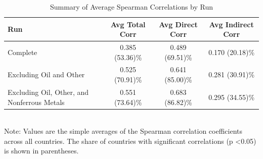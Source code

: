 \begin{table}[h]
\centering
\caption{Summary of Average Spearman Correlations by Run}
\begin{tabular}{lccc}
\toprule
\textbf{Run} & \textbf{Avg Total Corr} & \textbf{Avg Direct Corr} & \textbf{Avg Indirect Corr} \\
\midrule
Complete & 0.385 (53.36)\% & 0.489 (69.51)\% & 0.170 (20.18)\% \\
Excluding Oil and Other & 0.525 (70.91)\% & 0.641 (85.00)\% & 0.281 (30.91)\% \\
Excluding Oil, Other, and Nonferrous Metals & 0.551 (73.64)\% & 0.683 (86.82)\% & 0.295 (34.55)\% \\
\bottomrule
\end{tabular} \\ 
\scriptsize{Note: Values are the simple averages of the Spearman correlation coefficients across all countries. The share of countries with significant correlations (p <0.05) is shown in parentheses.}
\end{table}